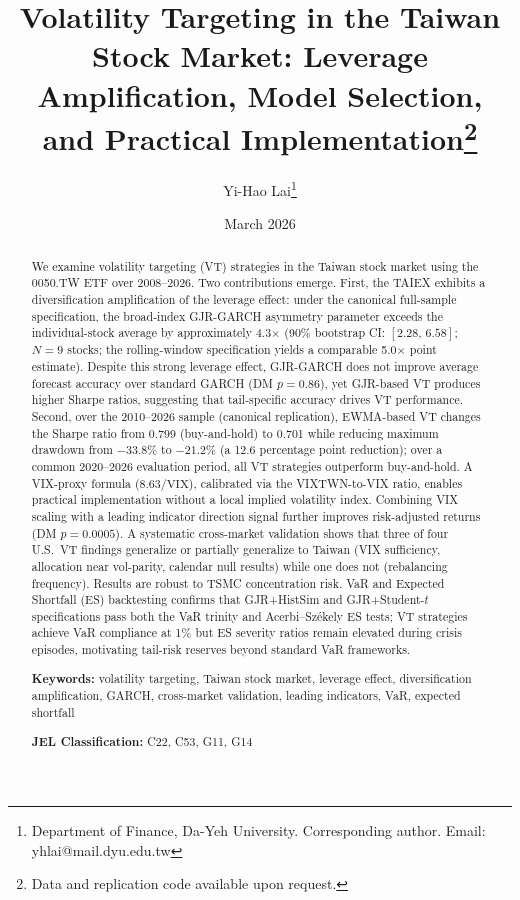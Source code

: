 \documentclass[12pt,a4paper]{article}
\title{Volatility Targeting in the Taiwan Stock Market: Leverage Amplification, Model Selection, and Practical Implementation\thanks{Data and replication code available upon request.}}
\author{Yi-Hao Lai\thanks{Department of Finance, Da-Yeh University. Corresponding author. Email: yhlai@mail.dyu.edu.tw}}
\date{March 2026}
\begin{document}
\maketitle

\begin{abstract}
\noindent
We examine volatility targeting (VT) strategies in the Taiwan stock market using the 0050.TW ETF over 2008--2026. Two contributions emerge. First, the TAIEX exhibits a diversification amplification of the leverage effect: under the canonical full-sample specification, the broad-index GJR-GARCH asymmetry parameter exceeds the individual-stock average by approximately 4.3$\times$ (90\% bootstrap CI: $[2.28, \, 6.58]$; $N = 9$ stocks; the rolling-window specification yields a comparable 5.0$\times$ point estimate). Despite this strong leverage effect, GJR-GARCH does not improve average forecast accuracy over standard GARCH (DM $p = 0.86$), yet GJR-based VT produces higher Sharpe ratios, suggesting that tail-specific accuracy drives VT performance. Second, over the 2010--2026 sample (canonical replication), EWMA-based VT changes the Sharpe ratio from 0.799 (buy-and-hold) to 0.701 while reducing maximum drawdown from $-33.8\%$ to $-21.2\%$ (a 12.6 percentage point reduction); over a common 2020--2026 evaluation period, all VT strategies outperform buy-and-hold. A VIX-proxy formula ($8.63/\text{VIX}$), calibrated via the VIXTWN-to-VIX ratio, enables practical implementation without a local implied volatility index. Combining VIX scaling with a leading indicator direction signal further improves risk-adjusted returns (DM $p = 0.0005$). A systematic cross-market validation shows that three of four U.S.\ VT findings generalize or partially generalize to Taiwan (VIX sufficiency, allocation near vol-parity, calendar null results) while one does not (rebalancing frequency). Results are robust to TSMC concentration risk. VaR and Expected Shortfall (ES) backtesting confirms that GJR+HistSim and GJR+Student-$t$ specifications pass both the VaR trinity and Acerbi--Sz\'{e}kely ES tests; VT strategies achieve VaR compliance at 1\% but ES severity ratios remain elevated during crisis episodes, motivating tail-risk reserves beyond standard VaR frameworks.

\medskip
\noindent
\textbf{Keywords:} volatility targeting, Taiwan stock market, leverage effect, diversification amplification, GARCH, cross-market validation, leading indicators, VaR, expected shortfall

\medskip
\noindent
\textbf{JEL Classification:} C22, C53, G11, G14
\end{abstract}
\end{document}
